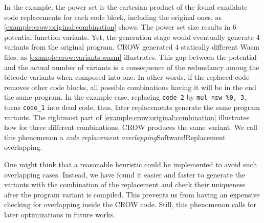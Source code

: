 In the example, the power set is the cartesian product of the found candidate code replacements for each code block, including the original ones, as \autoref{example:crow:original:combination} shows. The power set size results in $6$ potential function variants. Yet, the generation stage would eventually generate $4$ variants from the original program. CROW generated 4 statically different Wasm  files, as \autoref{example:crow:variants:wasm} illustrates. This gap between the potential and the actual number of variants is a consequence of the redundancy among the bitcode variants when composed into one. In other words, if the replaced code removes other code blocks, all possible combinations having it will be in the end the same program. In the example case, replacing \texttt{code\_2} by \texttt{mul nsw \%0, 3}, turns \texttt{code\_1} into dead code, thus, later replacements generate the same program variants. The rightmost part of \autoref{example:crow:original:combination} illustrates how for three different combinations, CROW produces the same variant. We call this phenomenon a \emph{code replacement overlapping}{Software!Replacement overlapping}.



One might think that a reasonable heuristic could be implemented to avoid such overlapping cases. Instead, we have found it easier and faster to generate the variants with the combination of the replacement and check their uniqueness after the program variant is compiled. This prevents us from having an expensive checking for overlapping inside the CROW code. Still, this phenomenon calls for later optimizations in future works.

